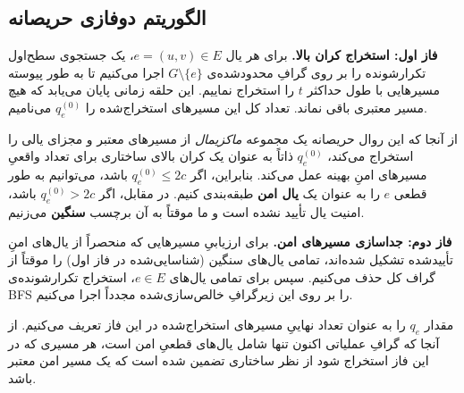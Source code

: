 \documentclass[11pt,a4paper]{report}
\theoremstyle{plain}
\theoremstyle{definition}
\theoremstyle{remark}
\begin{document}
\subsection{الگوریتم دوفازی حریصانه}
\textbf{فاز اول: استخراج کران بالا.}
برای هر یال $e = (u,v) \in E$، یک جستجوی سطح‌اول تکرارشونده را بر روی گرافِ محدودشده‌ی $G \setminus \{e\}$ اجرا می‌کنیم تا به طور پیوسته مسیرهایی با طول حداکثر $t$ را استخراج نماییم. این حلقه زمانی پایان می‌یابد که هیچ مسیر معتبری باقی نماند. تعداد کل این مسیرهای استخراج‌شده را $q_e^{(0)}$ می‌نامیم.

از آنجا که این روال حریصانه یک مجموعه \emph{ماکزیمال} از مسیرهای معتبر و مجزای یالی را استخراج می‌کند، $q_e^{(0)}$ ذاتاً به عنوان یک کران بالای ساختاری برای تعداد واقعیِ مسیرهای امنِ بهینه عمل می‌کند. بنابراین، اگر $q_e^{(0)} \le 2c$ باشد، می‌توانیم به طور قطعی $e$ را به عنوان یک \textbf{یال امن} طبقه‌بندی کنیم. در مقابل، اگر $q_e^{(0)} > 2c$ باشد، امنیت یال تأیید نشده است و ما موقتاً به آن برچسب \textbf{سنگین} می‌زنیم.

\textbf{فاز دوم: جداسازی مسیرهای امن.}
برای ارزیابیِ مسیرهایی که منحصراً از یال‌های امنِ تأییدشده تشکیل شده‌اند، تمامی یال‌های سنگین (شناسایی‌شده در فاز اول) را موقتاً از گراف کل حذف می‌کنیم. سپس برای تمامی یال‌های $e \in E$، استخراج تکرارشونده‌ی BFS را بر روی این زیرگرافِ خالص‌سازی‌شده مجدداً اجرا می‌کنیم. 

مقدار $q_e$ را به عنوان تعداد نهاییِ مسیرهای استخراج‌شده در این فاز تعریف می‌کنیم. از آنجا که گرافِ عملیاتی اکنون تنها شامل یال‌های قطعیِ امن است، هر مسیری که در این فاز استخراج شود از نظر ساختاری تضمین شده است که یک مسیر امن معتبر باشد.
\end{document}
